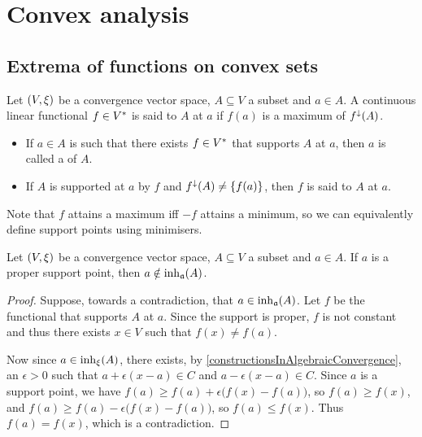 

\chapter{Convex analysis}

\section{Extrema of functions on convex sets}
\begin{definition}
Let $\sSet{V,\xi}$ be a convergence vector space, $A\subseteq V$ a subset and $a\in A$. A continuous linear functional $f\in {V}^*$ is said to  $A$ at $a$ if $f(a)$ is a maximum of $f^\downarrow(A)$.
\begin{itemize}
\item If $a\in A$ is such that there exists $f\in {V}^*$ that supports $A$ at $a$, then $a$ is called a  of $A$.
\item If $A$ is supported at $a$ by $f$ and $f^{\downarrow}(A) \neq \{f(a)\}$, then $f$ is said to  $A$ at $a$.
\end{itemize}
\end{definition}
Note that $f$ attains a maximum iff $-f$ attains a minimum, so we can equivalently define support points using minimisers.

\begin{lemma} \label{supportPointsNotInCore}
Let $\sSet{V,\xi}$ be a convergence vector space, $A\subseteq V$ a subset and $a\in A$. If $a$ is a proper support point, then $a\notin \operatorname{inh}_\mathfrak{a}(A)$.
\end{lemma}
\begin{proof}
Suppose, towards a contradiction, that $a\in \operatorname{inh}_\mathfrak{a}(A)$. Let $f$ be the functional that supports $A$ at $a$. Since the support is proper, $f$ is not constant and thus there exists $x\in V$ such that $f(x) \neq f(a)$.

Now since $a\in \operatorname{inh}_\xi(A)$, there exists, by \ref{constructionsInAlgebraicConvergence}, an $\epsilon >0$ such that $a+\epsilon(x-a)\in C$ and $a-\epsilon (x-a)\in C$. Since $a$ is a support point, we have $f(a) \geq f(a) + \epsilon \big(f(x) - f(a)\big)$, so $f(a) \geq f(x)$, and $f(a) \geq f(a) - \epsilon \big(f(x) - f(a)\big)$, so $f(a)\leq f(x)$. Thus $f(a) = f(x)$, which is a contradiction.
\end{proof}

